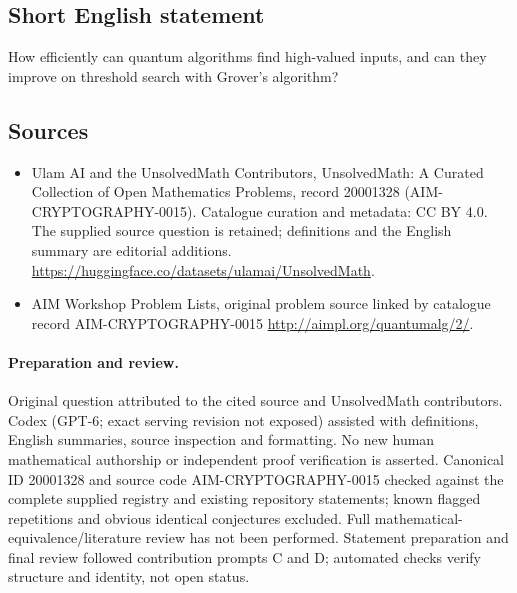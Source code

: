 \documentclass[11pt]{article}
\begin{document}
\subsection{Short English statement}
How efficiently can quantum algorithms find high-valued inputs, and can they improve on threshold search with Grover's algorithm?
\subsection{Sources}
\begin{itemize}
\item[\hypertarget{source:20001328:1}{S1}] Ulam AI and the UnsolvedMath Contributors, UnsolvedMath: A Curated Collection of Open Mathematics Problems, record 20001328 (AIM-CRYPTOGRAPHY-0015). Catalogue curation and metadata: CC BY 4.0. The supplied source question is retained; definitions and the English summary are editorial additions.
\url{https://huggingface.co/datasets/ulamai/UnsolvedMath}.
\item[\hypertarget{source:20001328:2}{S2}] AIM Workshop Problem Lists, original problem source linked by catalogue record AIM-CRYPTOGRAPHY-0015
\url{http://aimpl.org/quantumalg/2/}.
\end{itemize}
\paragraph{Preparation and review.}
Original question attributed to the cited source and UnsolvedMath contributors. Codex (GPT-6; exact serving revision not exposed) assisted with definitions, English summaries, source inspection and formatting. No new human mathematical authorship or independent proof verification is asserted. Canonical ID 20001328 and source code AIM-CRYPTOGRAPHY-0015 checked against the complete supplied registry and existing repository statements; known flagged repetitions and obvious identical conjectures excluded. Full mathematical-equivalence/literature review has not been performed. Statement preparation and final review followed contribution prompts C and D; automated checks verify structure and identity, not open status.
\label{end:20001328}
\end{document}
